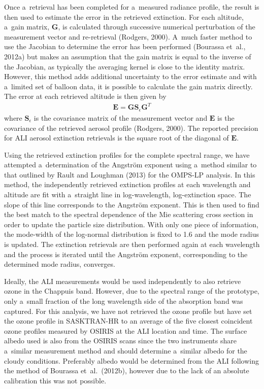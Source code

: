\documentclass[amtd, online, hvmath]{copernicus}
\begin{document}
Once a~retrieval has been completed for a~measured radiance profile,
the result is then used to estimate the error in the retrieved
extinction. For each altitude, a~gain matrix, $\mathbf{G}$, is
calculated through successive numerical perturbation of the
measurement vector and re-retrieval (Rodgers, 2000). A~much faster
method to use the Jacobian to determine the error has been performed
(Bourassa et~al., 2012a) but makes an assumption that the gain matrix
is equal to the inverse of the Jacobian, as typically the averaging
kernel is close to the identity matrix. However, this method adds
additional uncertainty to the error estimate and with a~limited set of
balloon data, it is possible to calculate the gain matrix
directly. The error at each retrieved altitude is then given by
\begin{align}
\mathbf{E}=\mathbf{G}\mathbf{S}_{\epsilon} \mathbf{G}^{T}
\end{align}
where $\mathbf{S}_{\epsilon}$ is the covariance matrix of the
measurement vector and $\mathbf{E}$ is the covariance of the retrieved
aerosol profile (Rodgers, 2000). The reported precision for ALI
aerosol extinction retrievals is the square root of the diagonal of
$\mathbf{E}$.

Using the retrieved extinction profiles for the complete spectral
range, we have attempted a~determination of the Angstr\"{o}m exponent
using a~method similar to that outlined by Rault and Loughman (2013)
for the OMPS-LP analysis. In this method, the independently retrieved
extinction profiles at each wavelength and altitude are fit with
a~straight line in log-wavelength, log-extinction space. The slope of
this line corresponds to the Angstr\"{o}m exponent. This is then used to
find the best match to the spectral dependence of the Mie scattering
cross section in order to update the particle size distribution. With
only one piece of information, the mode-width of the log-normal
distribution is fixed to 1.6 and the mode radius is updated. The
extinction retrievals are then performed again at each wavelength and
the process is iterated until the Angstr\"{o}m exponent, corresponding to
the determined mode radius, converges.

Ideally, the ALI measurements would be used independently to also
retrieve ozone in the Chappuis band. However, due to the spectral
range of the prototype, only a~small fraction of the long wavelength
side of the absorption band was captured. For this analysis, we have
not retrieved the ozone profile but have set the ozone profile in
SASKTRAN-HR to an average of the five closest coincident ozone
profiles measured by OSIRIS at the ALI location and time. The surface
albedo used is also from the OSIRIS scans since the two instruments
share a~similar measurement method and should determine a~similar
albedo for the cloudy conditions. Preferably albedo would be
determined from the ALI following the method of Bourassa
et~al.~(2012b), however due to the lack of an absolute calibration
this was not possible.
\end{document}
